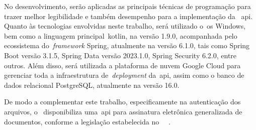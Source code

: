 No desenvolvimento, serão aplicadas as principais técnicas de programação para
trazer melhor legibilidade e também desempenho para a implementação da
~\acrfull{api}.
Quanto às tecnologias envolvidas neste trabalho, será utilizado o~\acrfull{os}
Windows, bem como a linguagem principal~\acrfull{kotlin}, na versão 1.9.0,
acompanhada pelo ecossistema do~\textit{framework} Spring, atualmente na versão
6.1.0, tais como Spring Boot versão 3.1.5, Spring Data versão 2023.1.0, Spring
Security 6.2.0, entre outros.
Além disso, será utilizada a plataforma de nuvem Google Cloud para gerenciar
toda a infraestrutura de~\textit{deployment} da~\acrshort{api}, assim como o
banco de dados relacional PostgreSQL, atualmente na versão 16.0.

De modo a complementar este trabalho, especificamente na autenticação dos
arquivos,
o~\citeauthor*{govbr2020} disponibiliza uma~\acrshort{api} para assinatura
eletrônica
generalizada de documentos, conforme a legislação estabelecida no
~~\cite{govbr2020}.